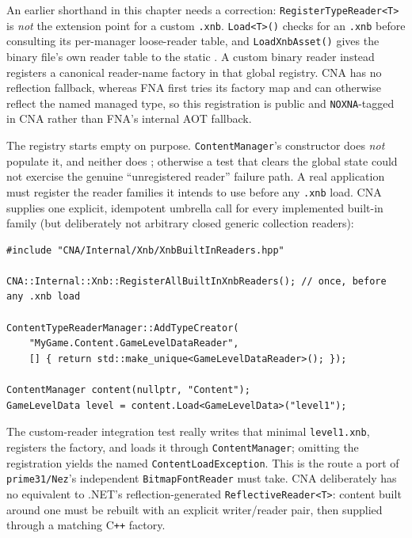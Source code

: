 An earlier shorthand in this chapter needs a correction: \texttt{RegisterTypeReader<T>} is
\emph{not} the extension point for a custom \texttt{.xnb}. \texttt{Load<T>()} checks for an
\texttt{.xnb} before consulting its per-manager loose-reader table, and
\texttt{LoadXnbAsset()} gives the binary file's own reader table to the static
. A custom binary reader instead registers a canonical
reader-name factory in that global registry. CNA has no reflection fallback, whereas FNA first
tries its factory map and can otherwise reflect the named managed type, so this registration is
public and \texttt{NOXNA}-tagged in CNA rather than FNA's internal AOT fallback.

The registry starts empty on purpose. \texttt{ContentManager}'s constructor does \emph{not}
populate it, and neither does ; otherwise a test that clears the global state could
not exercise the genuine ``unregistered reader'' failure path. A real application must register
the reader families it intends to use before any \texttt{.xnb} load. CNA supplies one explicit,
idempotent umbrella call for every implemented built-in family (but deliberately not arbitrary
closed generic collection readers):

\begin{lstlisting}
#include "CNA/Internal/Xnb/XnbBuiltInReaders.hpp"

CNA::Internal::Xnb::RegisterAllBuiltInXnbReaders(); // once, before any .xnb load

ContentTypeReaderManager::AddTypeCreator(
    "MyGame.Content.GameLevelDataReader",
    [] { return std::make_unique<GameLevelDataReader>(); });

ContentManager content(nullptr, "Content");
GameLevelData level = content.Load<GameLevelData>("level1");
\end{lstlisting}

The custom-reader integration test really writes that minimal \texttt{level1.xnb}, registers the
factory, and loads it through \texttt{ContentManager}; omitting the registration yields the
named \texttt{ContentLoadException}. This is the route a port of
\texttt{prime31/Nez}'s independent \texttt{BitmapFontReader} must take. CNA deliberately has no
equivalent to .NET's reflection-generated \texttt{ReflectiveReader<T>}: content built around one
must be rebuilt with an explicit writer/reader pair, then supplied through a matching C\texttt{++}
factory.

